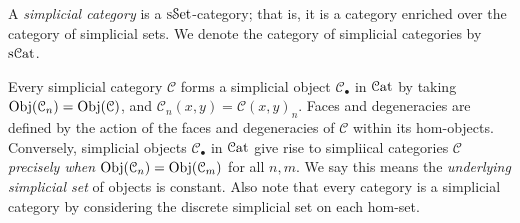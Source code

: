 \begin{definition}\label{1.1.4.1}
	A \emph{simplicial category} is a $\mathrm{s}\mathcal{S}\mathrm{et} $-category; that is, it is a category enriched over the category of simplicial sets. We denote the category of simplicial categories by $\mathrm{s} \mathcal{C}\mathrm{at} $.
\end{definition}

\begin{remark}\label{1.1.4.2}
	Every simplicial category $\mathcal{C} $ forms a simplicial object $\mathcal{C} _{\bullet} $ in $\mathcal{C}\mathrm{at} $ by taking $\operatorname{Obj}(\mathcal{C}_n )=\operatorname{Obj}(\mathcal{C} ) $, and $\mathcal{C} _n(x,y)=\mathcal{C} (x,y)_n$. Faces and degeneracies are defined by the action of the faces and degeneracies of $\mathcal{C} $ within its hom-objects. Conversely, simplicial objects $\mathcal{C} _{\bullet} $ in $\mathcal{C}\mathrm{at} $ give rise to simpliical categories $\mathcal{C} $ \emph{precisely when} $\operatorname{Obj}(\mathcal{C}_n )=\operatorname{Obj}(\mathcal{C} _m)  $ for all $n,m$. We say this means the \emph{underlying simplicial set} of objects is constant. Also note that every category is a simplicial category by considering the discrete simplicial set on each hom-set.
\end{remark}

